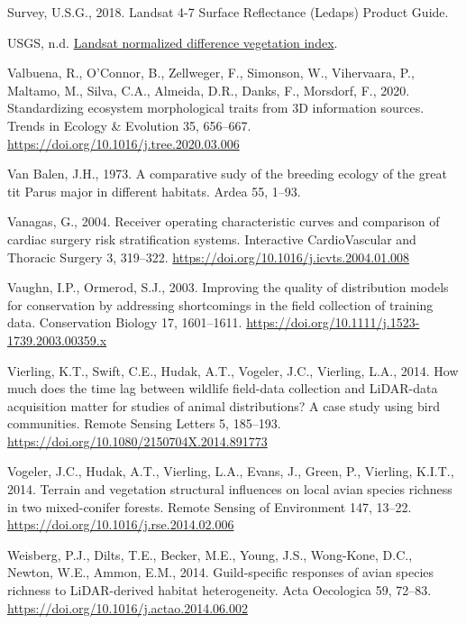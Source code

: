 \documentclass[
  12pt,
]{article}
\newlength{\cslhangindent}
\newlength{\cslentryspacingunit} %
\newenvironment{CSLReferences}[2] %
 {%
  \setlength{\parindent}{0pt}
  \ifodd #1
  \let\oldpar\par
  \def\par{\hangindent=\cslhangindent\oldpar}
  \fi
  \setlength{\parskip}{#2\cslentryspacingunit}
 }%
 {}
\begin{document}
\begin{CSLReferences}{1}{0}
\leavevmode{}%
Survey, U.S.G., 2018. Landsat 4-7 {Surface} {Reflectance} ({Ledaps}) {Product} {Guide}.

\leavevmode{}%
USGS, n.d. \href{https://www.usgs.gov/land-resources/nli/landsat/landsat-normalized-difference-vegetation-index?qt-science_support_page_related_con=0\#qt-science_support_page_related_con}{Landsat normalized difference vegetation index}.

\leavevmode{}%
Valbuena, R., O'Connor, B., Zellweger, F., Simonson, W., Vihervaara, P., Maltamo, M., Silva, C.A., Almeida, D.R., Danks, F., Morsdorf, F., 2020. Standardizing ecosystem morphological traits from {3D} information sources. Trends in Ecology \& Evolution 35, 656--667. \url{https://doi.org/10.1016/j.tree.2020.03.006}

\leavevmode{}%
Van Balen, J.H., 1973. A comparative sudy of the breeding ecology of the great tit {Parus} major in different habitats. Ardea 55, 1--93.

\leavevmode{}%
Vanagas, G., 2004. Receiver operating characteristic curves and comparison of cardiac surgery risk stratification systems. Interactive CardioVascular and Thoracic Surgery 3, 319--322. \url{https://doi.org/10.1016/j.icvts.2004.01.008}

\leavevmode{}%
Vaughn, I.P., Ormerod, S.J., 2003. Improving the quality of distribution models for conservation by addressing shortcomings in the field collection of training data. Conservation Biology 17, 1601--1611. \url{https://doi.org/10.1111/j.1523-1739.2003.00359.x}

\leavevmode{}%
Vierling, K.T., Swift, C.E., Hudak, A.T., Vogeler, J.C., Vierling, L.A., 2014. How much does the time lag between wildlife field-data collection and {LiDAR}-data acquisition matter for studies of animal distributions? {A} case study using bird communities. Remote Sensing Letters 5, 185--193. \url{https://doi.org/10.1080/2150704X.2014.891773}

\leavevmode{}%
Vogeler, J.C., Hudak, A.T., Vierling, L.A., Evans, J., Green, P., Vierling, K.I.T., 2014. Terrain and vegetation structural influences on local avian species richness in two mixed-conifer forests. Remote Sensing of Environment 147, 13--22. \url{https://doi.org/10.1016/j.rse.2014.02.006}

\leavevmode{}%
Weisberg, P.J., Dilts, T.E., Becker, M.E., Young, J.S., Wong-Kone, D.C., Newton, W.E., Ammon, E.M., 2014. Guild-specific responses of avian species richness to {LiDAR}-derived habitat heterogeneity. Acta Oecologica 59, 72--83. \url{https://doi.org/10.1016/j.actao.2014.06.002}

\end{CSLReferences}

\pagebreak
\end{document}
